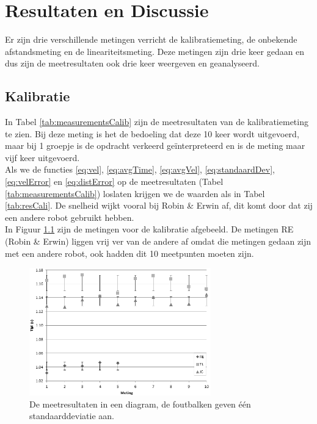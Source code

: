 \documentclass{report}
\begin{document}
\chapter{Resultaten en Discussie}
Er zijn drie verschillende metingen verricht de kalibratiemeting, de onbekende afstandsmeting en de lineariteitsmeting. Deze metingen zijn drie keer gedaan en dus zijn de meetresultaten ook drie keer weergeven en geanalyseerd.
\section{Kalibratie}
In Tabel \ref{tab:measurementsCalib} zijn de meetresultaten van de kalibratiemeting te zien. Bij deze meting is het de bedoeling dat deze 10 keer wordt uitgevoerd, maar bij 1 groepje is de opdracht verkeerd ge\"interpreteerd en is de meting maar vijf keer uitgevoerd.\\
Als we de functies \ref{eq:vel}, \ref{eq:avgTime},  \ref{eq:avgVel},  \ref{eq:standaardDev},  \ref{eq:velError} en  \ref{eq:distError} op de meetresultaten (Tabel \ref{tab:measurementsCalib}) loslaten krijgen we de waarden als in Tabel \ref{tab:resCali}. De snelheid wijkt vooral bij Robin \& Erwin af, dit komt door dat zij een andere robot gebruikt hebben.\\

In Figuur \ref{fig:measureGraph} zijn de metingen voor de kalibratie afgebeeld. De metingen RE (Robin \& Erwin) liggen vrij ver van de andere af omdat die metingen gedaan zijn met een andere robot, ook hadden dit 10 meetpunten moeten zijn.

\begin{figure}[H]
	\centering
	\includegraphics[width=0.7\textwidth]{kalibratie}
	\caption{De meetresultaten in een diagram, de foutbalken geven één standaarddeviatie aan.}
	\label{fig:measureGraph}
\end{figure}
\end{document}
